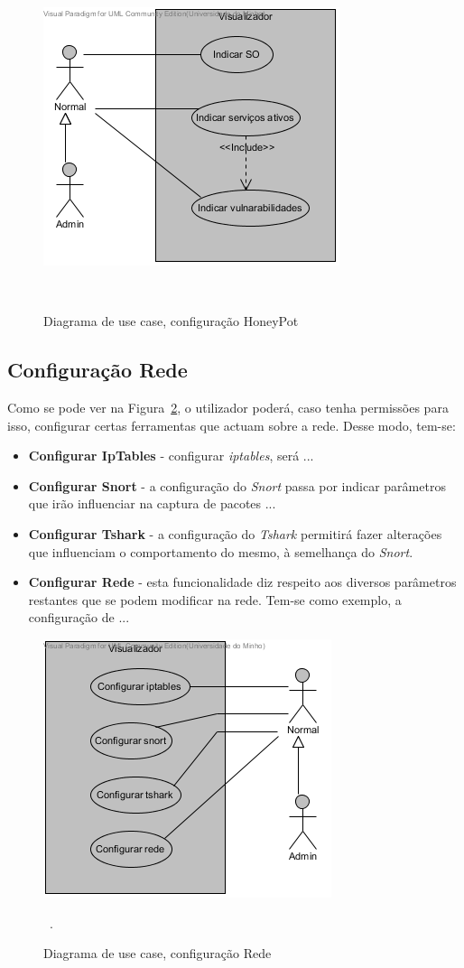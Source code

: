 \begin{figure}[!ht]
	\centering
	\includegraphics[scale=0.80]{images/ucs/ConfHoneyPot}
	\caption {Diagrama de use case, configuração HoneyPot}~\label{fig: confighoney}
\end{figure}
\pagebreak

\subsection{\textbf{Configuração Rede}}
Como se pode ver na Figura~\ref{fig: confrede}, o utilizador poderá, caso tenha permissões para isso, configurar certas ferramentas que actuam sobre a rede. Desse modo, tem-se:

\begin{itemize}
 \item \textbf{Configurar IpTables} - configurar \emph{iptables}, será ...
 \item \textbf{Configurar Snort} - a configuração do \emph{Snort} passa por indicar parâmetros que irão influenciar na captura de pacotes ...
 \item \textbf{Configurar Tshark} - a configuração do \emph{Tshark} permitirá fazer alterações que influenciam o comportamento do mesmo, à semelhança do \emph{Snort}.
 \item \textbf{Configurar Rede} - esta funcionalidade diz respeito aos diversos parâmetros restantes que se podem modificar na rede. Tem-se como exemplo, a configuração de ...
\end{itemize}

\begin{figure}[!ht]
\centering
\includegraphics[scale=0.80]{images/ucs/ConfRede}
\caption {Diagrama de use case, configuração Rede}~\label{fig: confrede}.
\end{figure}
\pagebreak

